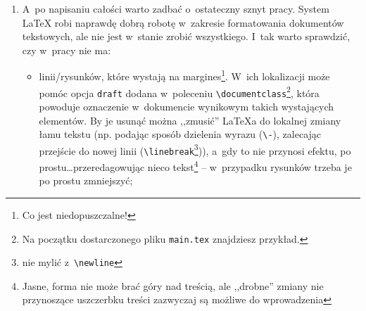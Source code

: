 \begin{enumerate}
W~tym przykładzie użyto stylu bibliografii o~nazwie \verb+alpha+\footnote{W polskiej wersji zdefiniowany jest on w~dostępnym w~internecie pliku \texttt{plalpha.bst}, jednakże ze względu na znajdujące się w~nim błędy tutaj korzystamy z~jego poprawionej wersji umieszczonej w~pliku \texttt{alphapl.bst}.}\footnote{Niestety \BibTeX{} nie radzi sobie dobrze z~sortowaniem pozycji, których akronimy zawierają znaki diakrytyczne\footnotemark{} -- jak próbować temu zaradzić można zobaczyć w~umieszczonych w~pliku \texttt{bibliografia.bib} pozycjach opatrzonych etykietami \texttt{goral} i~\texttt{programy\_przeglad}.}, \cite{bibtex_alpha}. Stanowi on alternatywę/uzupełnienie powszechnie zalecanych jako ,,najbardziej czytelne'', tak zwanych ,,stylów nawiasowych''\footnote{W których to, jak np. w~przypisach harwardzkich~\cite{harwardzkie}, w~taki czy inny sposób w~tekście, w~miejscu cytowania podaje się odsyłacze w~postaci nazwiska autorów cytowanej pracy wraz z~rokiem publikacji. W~stylu \texttt{alpha} w~miejsce pełnych nazwisk jako odsyłacze używane są ich fragmenty w~przypadku pozycji jednoautorskich lub akronimy utworzone z~pierwszych liter nazwisk autorów w~pracach wieloautorskich, również uzupełnione rokiem publikacji.}, które obeznanemu czytelnikowi znacząco ułatwiają czytanie pracy i~kojarzenie odwołań do literatury, co jest utrudnione w~przypadku stosowania tak zwanych ,,stylów numerowanych''\footnote{takich jak np. system vancouverski~\cite{vancouverskie}}.  Zainteresowanych tematem odsyłamy do~\cite{literaturaa, literaturab}. Styl bibliografii można zmienić modyfikując argument polecenia \verb++. 
  
\item A~po napisaniu całości warto zadbać o~ostateczny sznyt pracy. System \LaTeX{} robi naprawdę dobrą robotę w~zakresie formatowania dokumentów tekstowych, ale nie jest w~stanie zrobić wszystkiego. I~tak warto sprawdzić, czy w~pracy nie ma: 
  \begin{itemize}
  \item linii/rysunków, które wystają na margines\footnote{Co jest niedopuszczalne!}. W~ich lokalizacji może pomóc opcja \verb+draft+ dodana w~poleceniu \texttt{\textbackslash documentclass}\footnote{Na początku dostarczonego pliku \texttt{main.tex} znajdziesz przykład.}, która powoduje oznaczenie w~dokumencie wynikowym takich wystających elementów. By je usunąć można ,,zmusić'' \LaTeX{}a do lokalnej zmiany łamu tekstu (np. podając sposób dzielenia wyrazu (\verb+\-+), zalecając przejście do nowej linii (\verb+\linebreak+\footnote{nie mylić z~\texttt{\textbackslash newline}})), a~gdy to nie przynosi efektu, po prostu\ldots przeredagowując nieco tekst\footnote{Jasne, forma nie może brać góry nad treścią, ale ,,drobne'' zmiany nie przynoszące uszczerbku treści zazwyczaj są możliwe do wprowadzenia \smiley} -- w~przypadku rysunków trzeba je po prostu zmniejszyć;


\end{itemize}
\end{enumerate}
